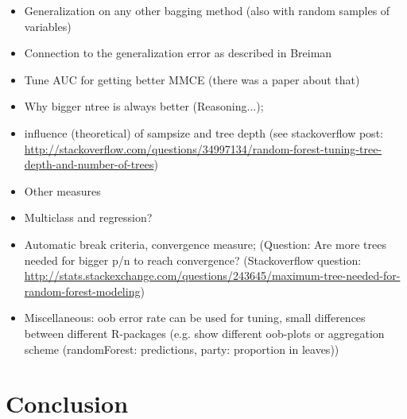 \documentclass[paper=a4
               ,12pt
               ,DIV=12
               ,parskip=half
               ,titlepage=on
               ,headinclude 
               ,footinclude
               ,headsepline
               ,footsepline         %
               ,ilines 
               ]{scrartcl}
\begin{document}
\begin{itemize}
 \item Generalization on any other bagging method (also with random samples of variables)
 \item Connection to the generalization error as described in Breiman
 \item Tune AUC for getting better MMCE (there was a paper about that)
 \item Why bigger ntree is always better (Reasoning...);
 \item influence (theoretical) of sampsize and tree depth (see stackoverflow post: \url{http://stackoverflow.com/questions/34997134/random-forest-tuning-tree-depth-and-number-of-trees})
 \item Other measures
 \item Multiclass and regression?
 \item Automatic break criteria, convergence measure; (Question: Are more trees needed for bigger p/n to reach convergence? (Stackoverflow question: \url{http://stats.stackexchange.com/questions/243645/maximum-tree-needed-for-random-forest-modeling})
 \item Miscellaneous: oob error rate can be used for tuning, small differences between different R-packages (e.g. show different oob-plots or aggregation scheme (randomForest: predictions, party: proportion in leaves))
\end{itemize}

\section{Conclusion}


\end{document}
